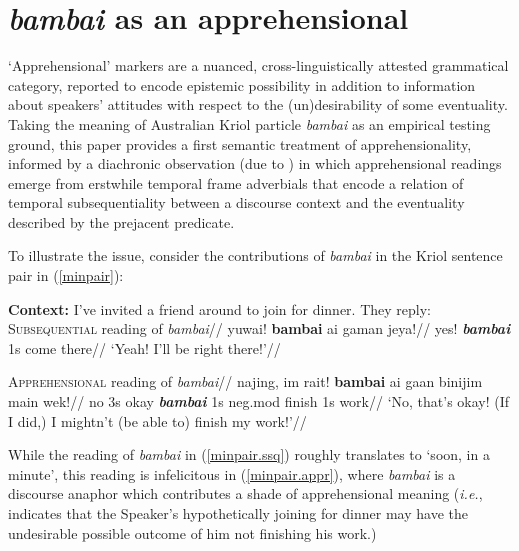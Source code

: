 

%
\chapter{\textit{bambai} as an apprehensional}\label{bambai.desc}



	`Apprehensional' markers are a nuanced, cross-linguistically attested grammatical category, reported to encode epistemic possibility in addition to information about speakers' attitudes with respect to the (un)desirability of some eventuality. Taking the meaning of Australian Kriol particle \textit{bambai} as an empirical testing ground, this paper provides a first semantic treatment of apprehensionality, informed by a diachronic observation (due to \citealp{Angelo2016}) in which apprehensional readings emerge from erstwhile temporal frame adverbials that encode a relation of temporal {\sc subsequentiality} between a discourse context and the eventuality described by the prejacent predicate.

To illustrate the issue, consider the contributions of \textit{bambai} in the Kriol sentence pair in (\ref{minpair}):

\pex\label{minpair}\textbf{Context:} \textup{I've invited a friend around to join for dinner. They reply:}
	\a\label{minpair.ssq}\begingl\glpreamble\textsc{Subsequential} reading of \textit{bambai}//
		\gla yuwai! \textbf{bambai} ai gaman jeya!//
		\glb yes! \textbf{\textit{bambai}} 1s come there//
		\glft ‘Yeah! I’ll be right there!’//\endgl
		
	\a\begingl\glpreamble \label{minpair.appr}\textsc{Apprehensional} reading of \textit{bambai}//
		\gla najing, im rait! \textbf{bambai} ai gaan binijim main wek!//
		\glb no 3s okay \textbf{\textit{bambai}} 1s {\sc neg.mod} finish 1s work//
		\glft ‘No, that’s okay! (If I did,) I mightn’t (be able to) finish my work!'\trailingcitation{[GT~20170316]}//\endgl
\xe


While the reading of \textit{bambai} in (\ref{minpair.ssq}) roughly translates to `soon, in a minute', this reading is infelicitous in (\ref{minpair.appr}), where \textit{bambai} is a discourse anaphor which contributes a shade of apprehensional meaning (\textit{i.e.}, indicates that the Speaker's hypothetically joining for dinner may have the undesirable possible outcome of him not finishing his work.) 

